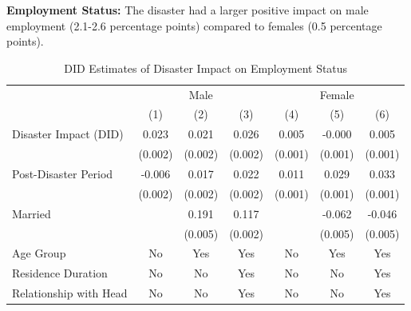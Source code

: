 \documentclass[serif, aspectratio=169]{beamer}
\begin{document}
\begin{frame}[label=employed]

\textbf{Employment Status:} The disaster had a larger positive impact on male employment (2.1-2.6 percentage points) compared to females (0.5 percentage points).

\begin{table}[htbp]
\centering
\caption{DID Estimates of Disaster Impact on Employment Status}

\vspace{-0.2cm}


\begin{tabular}{@{}l*{6}{c}@{}}
          &\multicolumn{3}{c}{Male}                                &\multicolumn{3}{c}{Female}                              \\\cmidrule(lr){2-4}\cmidrule(lr){5-7}
          &\multicolumn{1}{c}{(1)}         &\multicolumn{1}{c}{(2)}         &\multicolumn{1}{c}{(3)}         &\multicolumn{1}{c}{(4)}         &\multicolumn{1}{c}{(5)}         &\multicolumn{1}{c}{(6)}         \\
\toprule
Disaster Impact (DID)&    0.023\sym{***}&    0.021\sym{***}&    0.026\sym{***}&    0.005\sym{***}&   -0.000         &    0.005\sym{***}\\
          &  (0.002)         &  (0.002)         &  (0.002)         &  (0.001)         &  (0.001)         &  (0.001)         \\
\addlinespace
Post-Disaster Period&   -0.006\sym{***}&    0.017\sym{***}&    0.022\sym{***}&    0.011\sym{***}&    0.029\sym{***}&    0.033\sym{***}\\
          &  (0.002)         &  (0.002)         &  (0.002)         &  (0.001)         &  (0.001)         &  (0.001)         \\
\addlinespace
Married   &                  &    0.191\sym{***}&    0.117\sym{***}&                  &   -0.062\sym{***}&   -0.046\sym{***}\\
          &                  &  (0.005)         &  (0.002)         &                  &  (0.005)         &  (0.005)         \\
\midrule
Age Group   &       No         &      Yes         &      Yes         &       No         &      Yes         &      Yes         \\
Residence Duration&       No         &       No         &      Yes         &       No         &       No         &      Yes         \\
Relationship with Head&       No         &       No         &      Yes         &       No         &       No         &      Yes         \\

\end{tabular}
\end{table}
\end{frame}
\end{document}
